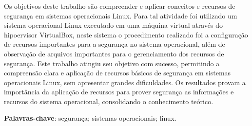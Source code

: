 \documentclass[
	12pt,				%
	oneside,   	        %
	a4paper,			%
	english,			%
	french,				%
	spanish,			%
	brazil,				%
	]{pacotes/abntex2}
\begin{document}
\frenchspacing 



\imprimirfolhaderosto



\begin{resumo}
Os objetivos deste trabalho são compreender e aplicar conceitos e recursos de segurança em sistemas operacionais Linux. Para tal atividade foi utilizado um sistema operacional Linux executado em uma máquina virtual através do hipoervisor VirtualBox, neste sistema o procedimento realizado foi a configuração de recursos importantes para a segurança no sistema operacional, além de observação de arquivos importantes para o gerenciamento dos recursos de segurança. Este trabalho atingiu seu objetivo com sucesso, permitindo a compreensão clara e aplicação de recursos básicos de segurança em sistemas operacionais Linux, sem apresentar grandes dificuldades. Os resultados provam a importância da aplicação de recursos para prover segurança as informações e recursos do sistema operacional, consolidando o conhecimento teórico.

 \vspace{\onelineskip}
    
 \noindent
 \textbf{Palavras-chave}: segurança; sistemas operacionais; linux.
\end{resumo}



\end{document}
